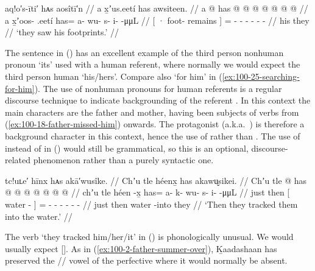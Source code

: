 \ex\label{ex:100-28-see-footprints}%
%
\begingl
	\glpreamble	aq!o′s-īti′ hᴀs aosîtī′n //
	\glpreamble	a x̱ʼus.eetí has awsiteen. //
	\gla	{} a  @ {} {} 
		has @  @ {} @ {} @ {} @ {} @ {} @ {} //
	\glb	{} a x̱ʼoos- .eetí {} 
		has= a- wu- {} s- i-  -μμL //
	\glc	{}[ · foot- remains {}]
		= - - - - -  - //
	\gld	{} his  {} {} 
		they  {} {} {} {} {} {} //
	\glft	‘they saw his footprints.’
		//
\endgl
\xe

The sentence in (\lastx) has an excellent example of the third person nonhuman pronoun  ‘its’ used with a human referent, where normally we would expect the third person human  ‘his/hers’.
Compare also  ‘for him’ in (\ref{ex:100-25-searching-for-him}).
The use of nonhuman pronouns for human referents is a regular discourse technique to indicate backgrounding of the referent \parencites{leer:1990b}{leer:1993}.
In this context the main characters are the father and mother, having been subjects of verbs from (\ref{ex:100-18-father-missed-him}) onwards.
The protagonist  (a.k.a.\ ) is therefore a background character in this context, hence the use of  rather than .
The use of  instead of  in (\lastx) would still be grammatical, so this is an optional, discourse-related phenomenon rather than a purely syntactic one.

\ex\label{ex:100-29-track-into-water}%
%
\begingl
	\glpreamble	tc!uʟe′ hīnx hᴀs akā′wusîke. //
	\glpreamble	Chʼu tle héenx̱ has akawu̬sikei. //
	\gla	Chʼu tle {}  @ {} {}
		has @  @ {} @ {} @ {} @ {} @ {} @ {} //
	\glb	chʼu tle {} héen -x̱ {}
		has= a- k- wu- s- i-  -μμL //
	\glc	just then {}[ water - {}]
		= - - - - -  - //
	\gld	just then {} water -into {}
		they  {} {} {} {} {} {} //
	\glft	‘Then they tracked them into the water.’
		//
\endgl
\xe

The verb  ‘they tracked him/her/it’ in (\lastx) is phonologically unusual.
We would usually expect  [].
As in (\ref{ex:100-2-father-summer-over}), Ḵaadashaan has preserved the // vowel of the perfective where it would normally be absent.

